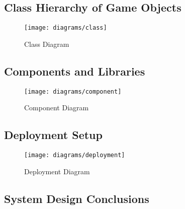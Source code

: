 \newpage

\subsection{Class Hierarchy of Game Objects}

\begin{figure}[!h]
\centering
\texttt{[image: diagrams/class]}
\caption{Class Diagram}\label{diag:class}
\end{figure}


\subsection{Components and Libraries}

\begin{figure}[!h]
\centering
\texttt{[image: diagrams/component]}
\caption{Component Diagram}\label{diag:component}
\end{figure}


\subsection{Deployment Setup}

\begin{figure}[!h]
\centering
\texttt{[image: diagrams/deployment]}
\caption{Deployment Diagram}\label{diag:deployment}
\end{figure}


\subsection{System Design Conclusions}

\clearpage
